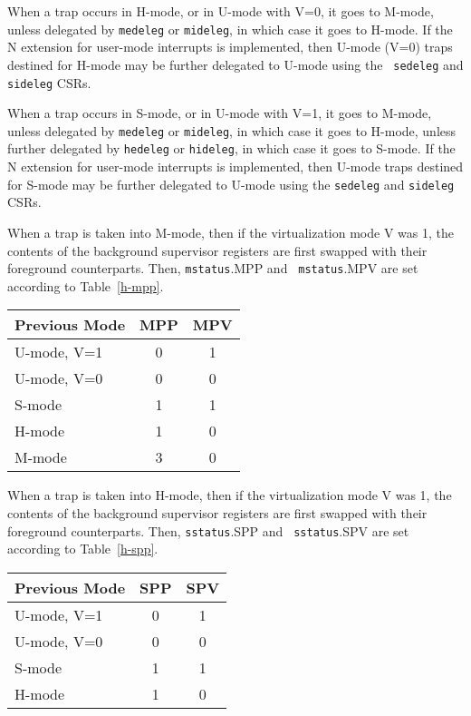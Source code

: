 When a trap occurs in H-mode, or in U-mode with V=0, it goes to M-mode, unless
delegated by {\tt medeleg} or {\tt mideleg}, in which case it goes to H-mode.
If the N extension for user-mode interrupts is implemented, then U-mode (V=0)
traps destined for H-mode may be further delegated to U-mode using the {\tt
sedeleg} and {\tt sideleg} CSRs.

When a trap occurs in S-mode, or in U-mode with V=1, it goes to M-mode, unless
delegated by {\tt medeleg} or {\tt mideleg}, in which case it goes to H-mode,
unless further delegated by {\tt hedeleg} or {\tt hideleg}, in which case it
goes to S-mode.  If the N extension for user-mode interrupts is implemented,
then U-mode traps destined for S-mode may be further delegated to U-mode
using the {\tt sedeleg} and {\tt sideleg} CSRs.

When a trap is taken into M-mode, then if the virtualization mode V was 1, the
contents of the background supervisor registers are first
swapped with their foreground counterparts.  Then, {\tt mstatus}.MPP and {\tt
mstatus}.MPV are set according to Table~\ref{h-mpp}.

\begin{table*}[h!]
\begin{center}
\begin{tabular}{|l|c|c|}
  \hline
  Previous Mode & MPP & MPV \\ \hline
  U-mode, V=1   & 0   & 1 \\
  U-mode, V=0   & 0   & 0 \\
  S-mode        & 1   & 1 \\
  H-mode        & 1   & 0 \\
  M-mode        & 3   & 0 \\ \hline
\end{tabular}
\end{center}
\caption{Value of {\tt mstatus} fields MPP and MPV after a trap into M-mode.
Upon trap return, MPV is ignored when MPP=3.}
\label{h-mpp}
\end{table*}

When a trap is taken into H-mode, then if the virtualization mode V was 1, the
contents of the background supervisor registers are first
swapped with their foreground counterparts.  Then, {\tt sstatus}.SPP and {\tt
sstatus}.SPV are set according to Table~\ref{h-spp}.

\begin{table*}[h!]
\begin{center}
\begin{tabular}{|l|c|c|}
  \hline
  Previous Mode & SPP & SPV \\ \hline
  U-mode, V=1   & 0   & 1 \\
  U-mode, V=0   & 0   & 0 \\
  S-mode        & 1   & 1 \\
  H-mode        & 1   & 0 \\ \hline
\end{tabular}
\end{center}
\caption{Value of {\tt sstatus} fields SPP and SPV after a trap into H-mode.}
\label{h-spp}
\end{table*}

